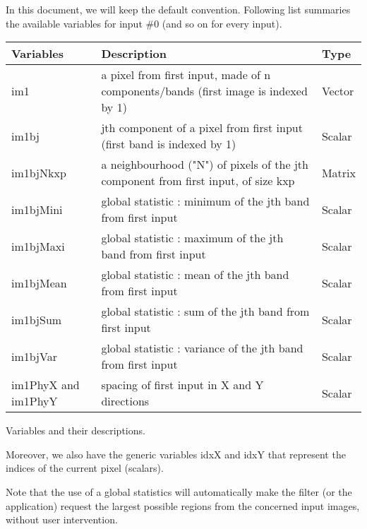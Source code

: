 In this document, we will keep the default convention. Following list 
summaries the available variables for input \#0 (and so on for every input).

\begin{center} 
\begin{tabular}{||l|l|l||}
\hline
\bf Variables & \bf Description & \bf Type \\
\hline\hline
im1 & a pixel from first input, made of n components/bands (first image is indexed by 1) & Vector \\
im1bj & jth component of a pixel from first input (first band is indexed by 1) & Scalar \\
im1bjNkxp & a neighbourhood ("N") of pixels of the jth component from first input, of size kxp & Matrix \\
im1bjMini & global statistic : minimum of the jth band from first input & Scalar \\
im1bjMaxi & global statistic : maximum of the jth band from first input & Scalar \\
im1bjMean & global statistic : mean of the jth band from first input & Scalar \\
im1bjSum & global statistic : sum of the jth band from first input & Scalar \\
im1bjVar & global statistic : variance of the jth band from first input & Scalar \\
im1PhyX and im1PhyY & spacing of first input in X and Y directions & Scalar \\
\hline
\end{tabular}
\end{center}
\caption{Variables and their descriptions.}
\label{variables}

Moreover, we also have the generic variables idxX and idxY that represent 
the indices of the current pixel (scalars). 

Note that the use of a global statistics will automatically make the filter 
(or the application) request the largest possible regions from the 
concerned input images, without user intervention.

\begin{center}
\end{center}

